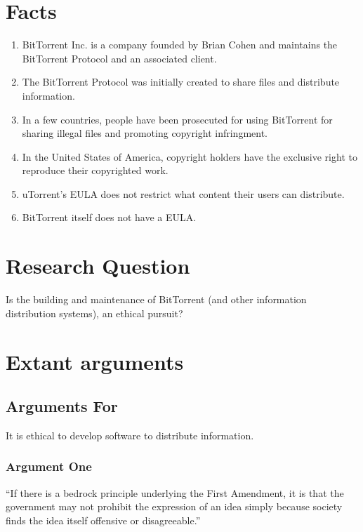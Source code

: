 \documentclass[11pt]{article}
\begin{document}
\section{Facts}
\begin{enumerate}
\item BitTorrent Inc. is a company founded by Brian Cohen and maintains the BitTorrent Protocol and an associated client. \cite{btabout}
\item The BitTorrent Protocol was initially created to share files and distribute information. \cite{btabout}
\item In a few countries, people have been prosecuted for using BitTorrent for sharing illegal files and promoting copyright infringment. \cite{tpbverdict}
\item In the United States of America, copyright holders have the exclusive right to reproduce their copyrighted work. \cite{t17c1s106}
\item uTorrent's EULA does not restrict what content their users can distribute. \cite{utorrentEula}
\item BitTorrent itself does not have a EULA. \cite{utorrentEula}
\end{enumerate}

\section{Research Question}
Is the building and maintenance of BitTorrent (and other information distribution systems), an ethical pursuit?

\section{Extant arguments}

\subsection{Arguments For}
It is ethical to develop software to distribute information.

\subsubsection{Argument One}
``If there is a bedrock principle underlying the First Amendment, it is that the government may not prohibit the expression of an idea simply because society finds the idea itself offensive or disagreeable.'' \cite[414]{1989texas}
\end{document}
